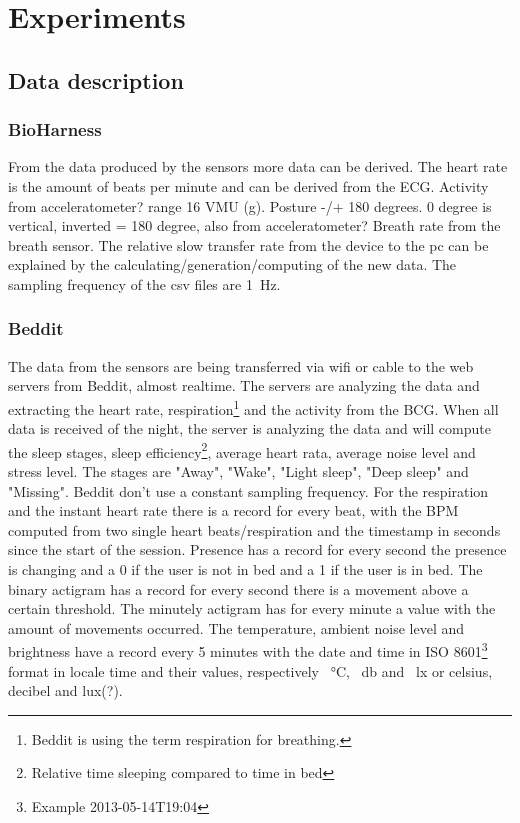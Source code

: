\section{Experiments}
	\subsection{Data description}
		\subsubsection{BioHarness}
			From the data produced by the sensors more data can be derived. The heart rate is the amount of beats per minute and can be derived from the ECG.  
			Activity from acceleratometer? range 16 VMU (g).
			Posture -/+ 180 degrees. 0 degree is vertical, inverted = 180 degree, also from acceleratometer?
			Breath rate from the breath sensor. 
			The relative slow transfer rate from the device to the pc can be explained by the calculating/generation/computing of the new data.
			The sampling frequency of the csv files are \SI{1}{\hertz}.
		\subsubsection{Beddit}
		\label{sec:datadescriptionbeddit}
			The data from the sensors are being transferred via wifi or cable to the web servers from Beddit, almost realtime. The servers are analyzing the data and extracting the heart rate, respiration\footnote{Beddit is using the term respiration for breathing.} and the activity from the BCG. When all data is received of the night, the server is analyzing the data and will compute the sleep stages, sleep efficiency\footnote{Relative time sleeping compared to time in bed}, average heart rata, average noise level and stress level. The stages are "Away", "Wake", "Light sleep", "Deep sleep" and "Missing". Beddit don't use a constant sampling frequency. For the respiration and the instant heart rate there is a record for every beat, with the BPM computed from two single heart beats/respiration and the timestamp in seconds since the start of the session. Presence has a record for every second the presence is changing and a 0 if the user is not in bed and a 1 if the user is in bed. The binary actigram has a record for every second there is a movement above a certain threshold. The minutely actigram has for every minute a value with the amount of movements occurred. The temperature, ambient noise level and brightness have a record every 5 minutes with the date and time in ISO 8601\footnote{Example 2013-05-14T19:04\cite{iso8601}} format in locale time and their values, respectively \SI{}{\celsius}, \SI{}{\decibel} and \SI{}{\lux} or celsius, decibel and lux(?).

